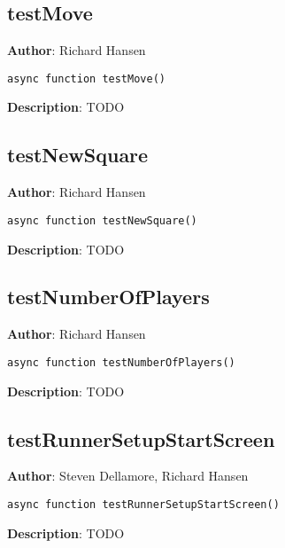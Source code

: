 \documentclass[12pt]{article}
\begin{document}
\subsection{testMove}
\textbf{Author}: Richard Hansen 
\vspace*{1\baselineskip}
\begin{lstlisting}
async function testMove()
\end{lstlisting} 
\vspace*{1\baselineskip}
\textbf{Description}: TODO 



\subsection{testNewSquare}
\textbf{Author}: Richard Hansen 
\vspace*{1\baselineskip}
\begin{lstlisting}
async function testNewSquare()
\end{lstlisting} 
\vspace*{1\baselineskip}
\textbf{Description}: TODO 



\subsection{testNumberOfPlayers}
\textbf{Author}: Richard Hansen 
\vspace*{1\baselineskip}
\begin{lstlisting}
async function testNumberOfPlayers()
\end{lstlisting} 
\vspace*{1\baselineskip}
\textbf{Description}: TODO 



\subsection{testRunnerSetupStartScreen}
\textbf{Author}: Steven Dellamore, Richard Hansen 
\vspace*{1\baselineskip}
\begin{lstlisting}
async function testRunnerSetupStartScreen()
\end{lstlisting} 
\vspace*{1\baselineskip}
\textbf{Description}: TODO 
\end{document}

